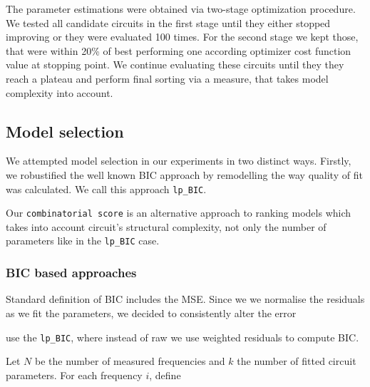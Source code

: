 \documentclass[
    11pt,
    a4paper,
    oneside
]{article}
\begin{document}
The parameter estimations were obtained via two-stage optimization procedure.
We tested all candidate circuits in the first stage until they either stopped improving or
they were evaluated 100 times. For the second stage we kept those, that were within 20\%
of best performing one according optimizer cost function value at stopping point. We continue evaluating these circuits until they they reach a plateau and
perform final sorting via a measure, that takes model complexity into account.


\subsection{Model selection}

We attempted model selection in our experiments in two distinct ways. Firstly, we
robustified the well known BIC approach by remodelling the way quality of fit was
calculated. We call this approach \texttt{lp\_BIC}.

Our \texttt{combinatorial score} is an alternative approach to ranking models 
which takes into account circuit's structural complexity, not only the number
of parameters like in the \texttt{lp\_BIC} case.

\subsubsection{BIC based approaches}


Standard definition of BIC includes the MSE. Since we we normalise the residuals as
we fit the parameters, we decided to consistently alter the error 

use the \texttt{lp\_BIC}, where instead of raw 
we use weighted residuals to compute BIC.

Let \(N\) be the number of measured frequencies and \(k\) the number of
fitted circuit parameters. For each frequency \(i\), define
\end{document}
